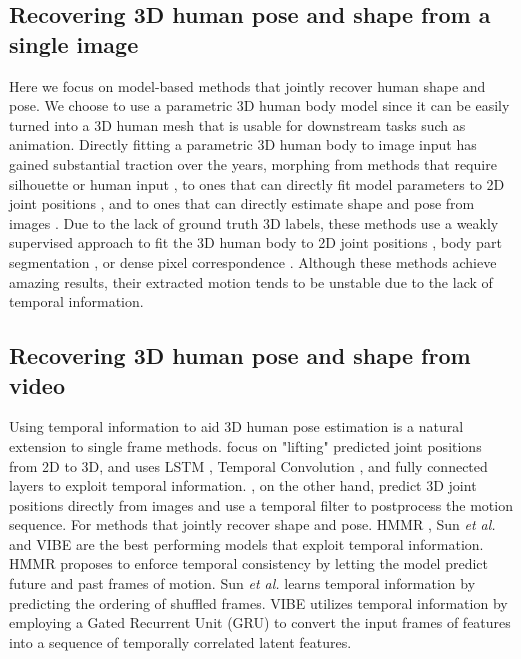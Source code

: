 \documentclass[runningheads]{llncs}
\begin{document}
\subsection{Recovering 3D human pose and shape from a single image}  
Here we focus on model-based methods that jointly recover human shape and pose. We choose to use a parametric 3D human body model \cite{smplx,SMPL,SCAPE} since it can be easily turned into a 3D human mesh that is usable for downstream tasks such as animation. Directly fitting a parametric 3D human body to image input has gained substantial traction over the years, morphing from methods that require silhouette or human input \cite{Grauman2003,Agarwal2006,Sigal2009,Zhou2010,5459300}, to ones that can directly fit model parameters to 2D joint positions \cite{smplify}, and to ones that can directly estimate shape and pose from images \cite{hmr,Omran2018,Guler2019,smplx,Tan2017,Tung2017,spin}. Due to the lack of ground truth 3D labels, these methods use a weakly supervised approach to fit the 3D human body to 2D joint positions \cite{hmr,Tan2017,Tung2017}, body part segmentation \cite{Omran2018,Pavlakos2018}, or dense pixel correspondence \cite{DenseRaC}. Although these methods achieve amazing results, their extracted motion tends to be unstable due to the lack of temporal information. 

\subsection{Recovering 3D human pose and shape from video}
Using temporal information to aid 3D human pose estimation is a natural extension to single frame methods. \cite{Hossain2018,Pavllo2019,Dabral2018,Xu} focus on "lifting" predicted joint positions from 2D to 3D, and uses LSTM \cite{Hossain2018}, Temporal Convolution \cite{Pavllo2019}, and fully connected layers  \cite{Dabral2018} to exploit temporal information. \cite{Mehta2017,Mehta2019}, on the other hand, predict 3D joint positions directly from images and use a temporal filter to postprocess the motion sequence. For methods that jointly recover shape and pose. HMMR \cite{hmmr}, Sun \textit{et al.} \cite{1908.07172} and VIBE \cite{vibe} are the best performing models that exploit temporal information. HMMR \cite{hmmr} proposes to enforce temporal consistency by letting the model predict future and past frames of motion. Sun \textit{et al.} \cite{1908.07172} learns temporal information by predicting the ordering of shuffled frames. VIBE \cite{vibe} utilizes temporal information by employing a Gated Recurrent Unit (GRU) to convert the input frames of features into a sequence of temporally correlated latent features. 
\end{document}
